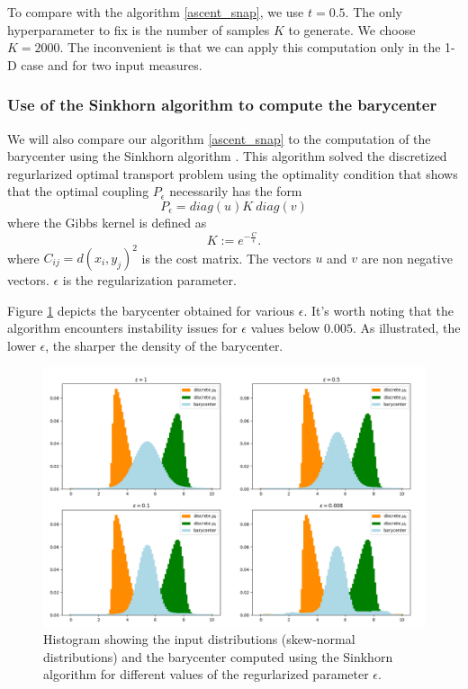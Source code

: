To compare with the algorithm \ref{ascent_snap}, we use $t=0.5$. The only hyperparameter to fix is the number of samples $K$ to generate. We choose $K=2000$. The inconvenient is that we can apply this computation only in the 1-D case and for two input measures.

\subsubsection{Use of the Sinkhorn algorithm to compute the barycenter} \label{sec:iterative_bregman}

We will also compare our algorithm \ref{ascent_snap} to the computation of the barycenter using the Sinkhorn algorithm \cite{peyre_computational_2020}. This algorithm solved the discretized regurlarized optimal transport problem using the optimality condition that shows that the optimal coupling $P_\epsilon$ necessarily has the form 
$$P_\epsilon = diag\left(u\right) K\ diag\left(v\right)$$
where the Gibbs kernel is defined as
$$K := e^{-\frac{C}{\epsilon}}.$$
where $C_{ij} = d(x_i, y_j)^2$ is the cost matrix. The vectors $u$ and $v$ are non negative vectors. $\epsilon$ is the regularization parameter.

Figure \ref{fig:sinkhorn_1D_2skew} depicts the barycenter obtained for various $\epsilon$. It's worth noting that the algorithm encounters instability issues for $\epsilon$ values below $0.005$. As illustrated, the lower $\epsilon$, the sharper the density of the barycenter.

\begin{figure}
    \centering
    \includegraphics[width=\textwidth]{figures/sinkhorn_1D_2skew.png}
    \caption{Histogram showing the input distributions (skew-normal distributions) and the barycenter computed using the Sinkhorn algorithm for different values of the regurlarized parameter $\epsilon$.}
    \label{fig:sinkhorn_1D_2skew}
\end{figure}

